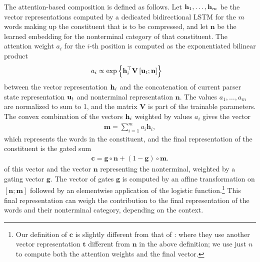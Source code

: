     The attention-based composition is defined as follows. Let $\mathbf{h}_1, \dots, \mathbf{h}_m$ be the vector representations computed by a dedicated bidirectional LSTM for the $m$ words making up the constituent that is to be compressed, and let $\mathbf{n}$ be the learned embedding for the nonterminal category of that constituent. The attention weight $a_i$ for the $i$-th position is computed as the exponentiated bilinear product
    \begin{align*}
      a_i &\propto \exp \Big\{ \mathbf{h}_i^{\top} \mathbf{V} \, [\mathbf{u}_t ; \mathbf{n}] \Big\}
    \end{align*}
    between the vector representation $\mathbf{h}_i$ and the concatenation of current parser state representation $\mathbf{u}_t$ and nonterminal representation $\mathbf{n}$. The values $a_1, \dots, a_m$ are normalized to sum to 1, and the matrix $\mathbf{V}$ is part of the trainable parameters. The convex combination of the vectors $\mathbf{h}_i$ weighted by values $a_i$ gives the vector
    \begin{align*}
      \mathbf{m} = \sum_{i=1}^m a_i \mathbf{h}_i,
    \end{align*}
    which represents the words in the constituent, and the final representation of the constituent is the gated sum
    \begin{align*}
      \mathbf{c} = \mathbf{g} \circ \mathbf{n} + (1 - \mathbf{g}) \circ \mathbf{m}.
    \end{align*}
    of this vector and the vector $\mathbf{n}$ representing the nonterminal, weighted by a gating vector $\mathbf{g}$. The vector of gates $\mathbf{g}$ is computed by an affine transformation on $[ \mathbf{n}; \mathbf{m} ]$ followed by an elementwise application of the logistic function.\footnote{Our definition of $\mathbf{c}$ is slightly different from that of \citet{kuncoro2017syntax}: where they use another vector representation $\mathbf{t}$ different from $\mathbf{n}$ in the above definition; we use just $n$ to compute both the attention weights and the final vector.} This final representation can weigh the contribution to the final representation of the words and their nonterminal category, depending on the context.

